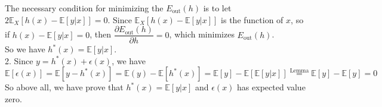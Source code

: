 The necessary condition for minimizing the $E_{\text{out}}(h)$ is to let $2 \mathbb{E}_X\left[h(x)-\mathbb{E}\left[y|x\right]\right]=0$.
Since $\mathbb{E}_X\left[h(x)-\mathbb{E}\left[y|x\right]\right]$ is the function of $x$, so if $h(x)-\mathbb{E}\left[y|x\right]=0$, 
then $\dfrac{\partial E_{\text{out}}(h)}{\partial h}=0$, which minimizes $E_{\text{out}}(h)$.\\
So we have $h^*(x)=\mathbb{E}[y|x]$.\\ 

2. Since $y=h^*(x)+\epsilon(x)$, we have
$$\mathbb{E}[\epsilon(x)]=\mathbb{E}[y-h^*(x)]=\mathbb{E}(y)-\mathbb{E}[h^*(x)]=\mathbb{E}[y]-\mathbb{E}\left[\mathbb{E}[y|x]\right]\stackrel{\text{Lemma}}{=}\mathbb{E}[y]-\mathbb{E}[y]=0$$
So above all, we have prove that $h^*(x)=\mathbb{E}[y|x]$ and $\epsilon(x)$ has expected value zero.\\
\newpage